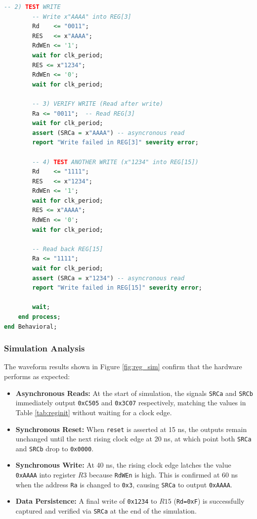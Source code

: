 \documentclass[12pt, a4paper]{report}
\begin{document}
\begin{lstlisting}[language=VHDL, 
                   caption={VHDL Implementation of the 16x16-bit Register TB File}, xleftmargin=-1cm, xrightmargin=-1cm,
                   label={lst:regTB_file}]
        -- 2) TEST WRITE
        -- Write x"AAAA" into REG[3]
        Rd    <= "0011";
        RES   <= x"AAAA";
        RdWEn <= '1';
		wait for clk_period;
		RES <= x"1234";
        RdWEn <= '0';
		wait for clk_period;
		
        -- 3) VERIFY WRITE (Read after write)
        Ra <= "0011";  -- Read REG[3]
        wait for clk_period;
        assert (SRCa = x"AAAA")	-- asyncronous read
        report "Write failed in REG[3]" severity error;

        -- 4) TEST ANOTHER WRITE (x"1234" into REG[15])
        Rd    <= "1111";
        RES   <= x"1234";
        RdWEn <= '1';
        wait for clk_period; 
		RES <= x"AAAA";
        RdWEn <= '0';
		wait for clk_period;
		
        -- Read back REG[15]
        Ra <= "1111";
        wait for clk_period;
        assert (SRCa = x"1234")	-- asyncronous read
        report "Write failed in REG[15]" severity error;

        wait;
    end process;
end Behavioral;                  
\end{lstlisting}

\subsubsection{Simulation Analysis}
The waveform results shown in Figure \ref{fig:reg_sim} confirm that the hardware performs as expected:

\begin{itemize}
    \item \textbf{Asynchronous Reads:} At the start of simulation, the signals \texttt{SRCa} and \texttt{SRCb} immediately output \texttt{0xC505} and \texttt{0x3C07} respectively, matching the values in Table \ref{tab:reginit} without waiting for a clock edge.
    \item \textbf{Synchronous Reset:} When \texttt{reset} is asserted at 15 ns, the outputs remain unchanged until the next rising clock edge at 20 ns, at which point both \texttt{SRCa} and \texttt{SRCb} drop to \texttt{0x0000}.
    \item \textbf{Synchronous Write:} At 40 ns, the rising clock edge latches the value \texttt{0xAAAA} into register $R3$ because \texttt{RdWEn} is high. This is confirmed at 60 ns when the address \texttt{Ra} is changed to \texttt{0x3}, causing \texttt{SRCa} to output \texttt{0xAAAA}.
    \item \textbf{Data Persistence:} A final write of \texttt{0x1234} to $R15$ (\texttt{Rd=0xF}) is successfully captured and verified via \texttt{SRCa} at the end of the simulation.
\end{itemize}
\end{document}
